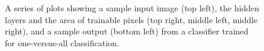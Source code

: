 \documentclass[]{article}
\begin{document}
\begin{figure}
	\centering
	\caption{A series of plots showing a sample input image (top left), the hidden layers and the area of trainable pixels (top right, middle left, middle right), and a sample output (bottom left) from a classifier trained for one-versus-all classification.}
\end{figure}
\end{document}

